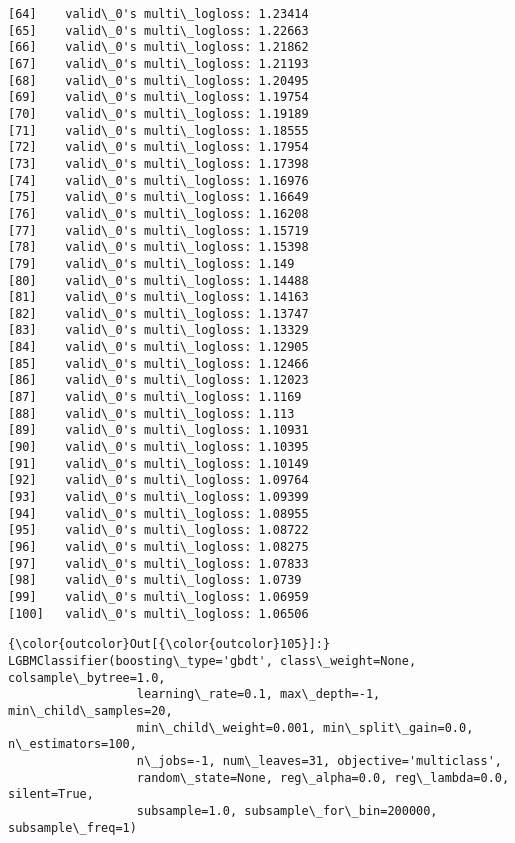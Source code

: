 \documentclass[11pt]{article}
\begin{document}
\begin{Verbatim}[commandchars=\\\{\}]
[64]	valid\_0's multi\_logloss: 1.23414
[65]	valid\_0's multi\_logloss: 1.22663
[66]	valid\_0's multi\_logloss: 1.21862
[67]	valid\_0's multi\_logloss: 1.21193
[68]	valid\_0's multi\_logloss: 1.20495
[69]	valid\_0's multi\_logloss: 1.19754
[70]	valid\_0's multi\_logloss: 1.19189
[71]	valid\_0's multi\_logloss: 1.18555
[72]	valid\_0's multi\_logloss: 1.17954
[73]	valid\_0's multi\_logloss: 1.17398
[74]	valid\_0's multi\_logloss: 1.16976
[75]	valid\_0's multi\_logloss: 1.16649
[76]	valid\_0's multi\_logloss: 1.16208
[77]	valid\_0's multi\_logloss: 1.15719
[78]	valid\_0's multi\_logloss: 1.15398
[79]	valid\_0's multi\_logloss: 1.149
[80]	valid\_0's multi\_logloss: 1.14488
[81]	valid\_0's multi\_logloss: 1.14163
[82]	valid\_0's multi\_logloss: 1.13747
[83]	valid\_0's multi\_logloss: 1.13329
[84]	valid\_0's multi\_logloss: 1.12905
[85]	valid\_0's multi\_logloss: 1.12466
[86]	valid\_0's multi\_logloss: 1.12023
[87]	valid\_0's multi\_logloss: 1.1169
[88]	valid\_0's multi\_logloss: 1.113
[89]	valid\_0's multi\_logloss: 1.10931
[90]	valid\_0's multi\_logloss: 1.10395
[91]	valid\_0's multi\_logloss: 1.10149
[92]	valid\_0's multi\_logloss: 1.09764
[93]	valid\_0's multi\_logloss: 1.09399
[94]	valid\_0's multi\_logloss: 1.08955
[95]	valid\_0's multi\_logloss: 1.08722
[96]	valid\_0's multi\_logloss: 1.08275
[97]	valid\_0's multi\_logloss: 1.07833
[98]	valid\_0's multi\_logloss: 1.0739
[99]	valid\_0's multi\_logloss: 1.06959
[100]	valid\_0's multi\_logloss: 1.06506

    \end{Verbatim}

\begin{Verbatim}[commandchars=\\\{\}]
{\color{outcolor}Out[{\color{outcolor}105}]:} LGBMClassifier(boosting\_type='gbdt', class\_weight=None, colsample\_bytree=1.0,
                  learning\_rate=0.1, max\_depth=-1, min\_child\_samples=20,
                  min\_child\_weight=0.001, min\_split\_gain=0.0, n\_estimators=100,
                  n\_jobs=-1, num\_leaves=31, objective='multiclass',
                  random\_state=None, reg\_alpha=0.0, reg\_lambda=0.0, silent=True,
                  subsample=1.0, subsample\_for\_bin=200000, subsample\_freq=1)
\end{Verbatim}
            
\end{document}
